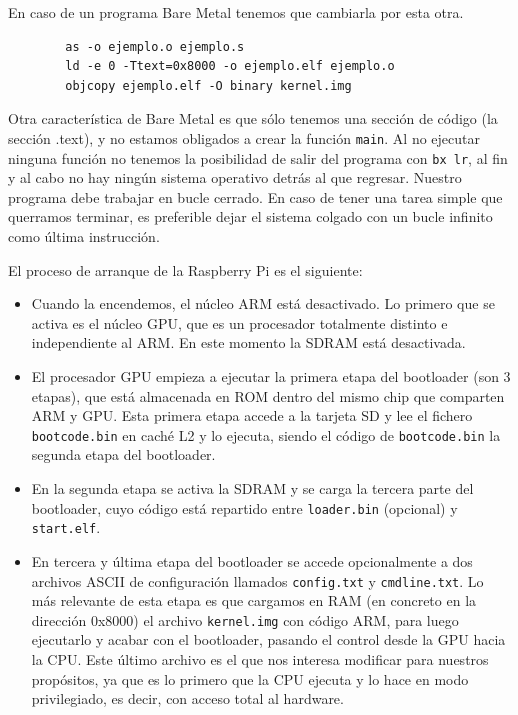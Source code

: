 En caso de un programa Bare Metal tenemos que cambiarla por esta otra.
\begin{lstlisting}
        as -o ejemplo.o ejemplo.s
        ld -e 0 -Ttext=0x8000 -o ejemplo.elf ejemplo.o
        objcopy ejemplo.elf -O binary kernel.img
\end{lstlisting}

Otra característica de Bare Metal es que sólo tenemos una sección de código (la sección
.text), y no estamos obligados a crear la función
{\tt main}. Al no ejecutar ninguna función no tenemos la posibilidad de salir del
programa con {\tt bx lr}, al fin y al cabo no hay ningún sistema operativo detrás al
que regresar. Nuestro programa debe trabajar en bucle cerrado. En caso de tener una
tarea simple que querramos terminar, es preferible dejar el sistema colgado con un
bucle infinito como última instrucción.

El proceso de arranque de la Raspberry Pi es el siguiente:

\begin{itemize}
  \item Cuando la encendemos, el núcleo ARM está desactivado. Lo primero que se activa es el
        núcleo GPU, que es un procesador totalmente distinto e independiente al ARM. En este
        momento la SDRAM está desactivada.
  \item El procesador GPU empieza a ejecutar la primera etapa del bootloader (son 3 etapas), que
        está almacenada en ROM dentro del mismo chip que comparten ARM y GPU. Esta primera etapa
        accede a la tarjeta SD y lee el fichero {\tt bootcode.bin} en caché L2 y lo ejecuta,
        siendo el código de {\tt bootcode.bin} la segunda etapa del bootloader.
  \item En la segunda etapa se activa la SDRAM y se carga la tercera parte del bootloader, cuyo
        código está repartido entre {\tt loader.bin} (opcional) y {\tt start.elf}.
  \item En tercera y última etapa del bootloader se accede opcionalmente a dos archivos ASCII de
        configuración llamados {\tt config.txt} y {\tt cmdline.txt}. Lo más relevante de esta
        etapa es que cargamos en RAM (en concreto en la dirección 0x8000) el archivo
        {\tt kernel.img} con código ARM, para luego ejecutarlo y acabar con el bootloader, pasando
        el control desde la GPU hacia la CPU.
        Este último archivo es el que nos interesa modificar para nuestros propósitos, ya que es
        lo primero que la CPU ejecuta y lo hace en modo privilegiado, es decir, con acceso total
        al hardware.
\end{itemize}


